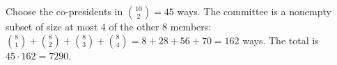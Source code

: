 Choose the co-presidents in $\binom{10}2=45$ ways. The committee is a nonempty subset of size at most $4$ of the other $8$ members: $\binom81+\binom82+\binom83+\binom84=8+28+56+70=162$ ways. The total is $45\cdot162=\boxed{7290}$.
